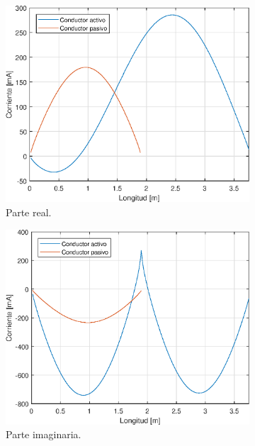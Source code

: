 \begin{figure}[H]
	\begin{subfigure}{0.5\textwidth}
		\includegraphics[scale=0.6]{imagenes/i_real_80.eps}
		\caption{Parte real.}
	\end{subfigure}
	\quad
	\begin{subfigure}{0.5\textwidth}
		\includegraphics[scale=0.6]{imagenes/i_imag_80.eps}
		\caption{Parte imaginaria.}
	\end{subfigure}
	\quad
	\begin{subfigure}{0.5\textwidth}

\end{subfigure}
\end{figure}
